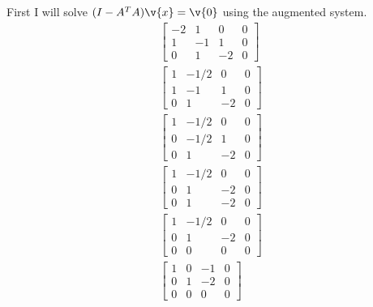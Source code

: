 \documentclass[11pt]{article}
\begin{document}
\begin{enumerate}
\begin{enumerate}
                First I will solve $(I - A^T A)\v{x} = \v{0}$ using the
                augmented system.
                \begin{align*}
                    \begin{bmatrix}
                        -2 &  1 &  0 & 0 \\
                         1 & -1 &  1 & 0 \\
                         0 &  1 & -2 & 0
                    \end{bmatrix} \\
                    \begin{bmatrix}
                         1 & -1/2 &  0 & 0 \\
                         1 & -1 &  1 & 0 \\
                         0 &  1 & -2 & 0
                    \end{bmatrix} \\
                    \begin{bmatrix}
                         1 & -1/2 &  0 & 0 \\
                         0 & -1/2 &  1 & 0 \\
                         0 &  1 & -2 & 0
                    \end{bmatrix} \\
                    \begin{bmatrix}
                         1 & -1/2 & 0 & 0 \\
                         0 & 1 & -2 & 0 \\
                         0 & 1 & -2 & 0
                    \end{bmatrix} \\
                    \begin{bmatrix}
                         1 & -1/2 &  0 & 0 \\
                         0 & 1 & -2 & 0 \\
                         0 & 0 & 0 & 0
                    \end{bmatrix} \\
                    \begin{bmatrix}
                         1 & 0 & -1 & 0 \\
                         0 & 1 & -2 & 0 \\
                         0 & 0 &  0 & 0
                    \end{bmatrix} \\
                \end{align*}

\end{enumerate}
\end{enumerate}
\end{document}
